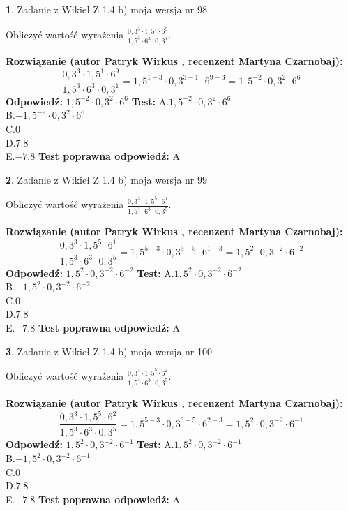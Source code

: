 \documentclass[12pt, a4paper]{article}
\theoremstyle{definition} %
\newtheorem{zad}{}
\newcommand{\zadStart}[1]{\begin{zad}#1\newline}
\newcommand{\zadStop}{\end{zad}}
\newcommand{\rozwStart}[2]{\noindent \textbf{Rozwiązanie (autor #1 , recenzent #2): }\newline}
\newcommand{\rozwStop}{\newline}
\newcommand{\odpStart}{\noindent \textbf{Odpowiedź:}\newline}
\newcommand{\odpStop}{\newline}
\newcommand{\testStart}{\noindent \textbf{Test:}\newline}
\newcommand{\testStop}{\newline}
\newcommand{\kluczStart}{\noindent \textbf{Test poprawna odpowiedź:}\newline}
\newcommand{\kluczStop}{\newline}
\begin{document}
\zadStart{Zadanie z Wikieł Z 1.4 b) moja wersja nr 98}

Obliczyć wartość wyrażenia $\frac{0,3^{3}\cdot1,5^{1}\cdot6^{9}}{1,5^{3}\cdot6^{3}\cdot0,3^{1}}$.
\zadStop
\rozwStart{Patryk Wirkus}{Martyna Czarnobaj}
$$\frac{0,3^{3}\cdot1,5^{1}\cdot6^{9}}{1,5^{3}\cdot6^{3}\cdot0,3^{1}} = 1,5^{1-3} \cdot 0,3^{3-1} \cdot 6^{9-3} = 1,5^{-2} \cdot 0,3^{2} \cdot 6^{6}$$
\rozwStop
\odpStart
$1,5^{-2} \cdot 0,3^{2} \cdot 6^{6}$
\odpStop
\testStart
A.$1,5^{-2} \cdot 0,3^{2} \cdot 6^{6}$\\ B.$-1,5^{-2} \cdot 0,3^{2} \cdot 6^{6}$\\ C.$0$\\ D.$7.8$\\ E.$-7.8$
\testStop
\kluczStart
A
\kluczStop



\zadStart{Zadanie z Wikieł Z 1.4 b) moja wersja nr 99}

Obliczyć wartość wyrażenia $\frac{0,3^{3}\cdot1,5^{5}\cdot6^{1}}{1,5^{3}\cdot6^{3}\cdot0,3^{5}}$.
\zadStop
\rozwStart{Patryk Wirkus}{Martyna Czarnobaj}
$$\frac{0,3^{3}\cdot1,5^{5}\cdot6^{1}}{1,5^{3}\cdot6^{3}\cdot0,3^{5}} = 1,5^{5-3} \cdot 0,3^{3-5} \cdot 6^{1-3} = 1,5^{2} \cdot 0,3^{-2} \cdot 6^{-2}$$
\rozwStop
\odpStart
$1,5^{2} \cdot 0,3^{-2} \cdot 6^{-2}$
\odpStop
\testStart
A.$1,5^{2} \cdot 0,3^{-2} \cdot 6^{-2}$\\ B.$-1,5^{2} \cdot 0,3^{-2} \cdot 6^{-2}$\\ C.$0$\\ D.$7.8$\\ E.$-7.8$
\testStop
\kluczStart
A
\kluczStop



\zadStart{Zadanie z Wikieł Z 1.4 b) moja wersja nr 100}

Obliczyć wartość wyrażenia $\frac{0,3^{3}\cdot1,5^{5}\cdot6^{2}}{1,5^{3}\cdot6^{3}\cdot0,3^{5}}$.
\zadStop
\rozwStart{Patryk Wirkus}{Martyna Czarnobaj}
$$\frac{0,3^{3}\cdot1,5^{5}\cdot6^{2}}{1,5^{3}\cdot6^{3}\cdot0,3^{5}} = 1,5^{5-3} \cdot 0,3^{3-5} \cdot 6^{2-3} = 1,5^{2} \cdot 0,3^{-2} \cdot 6^{-1}$$
\rozwStop
\odpStart
$1,5^{2} \cdot 0,3^{-2} \cdot 6^{-1}$
\odpStop
\testStart
A.$1,5^{2} \cdot 0,3^{-2} \cdot 6^{-1}$\\ B.$-1,5^{2} \cdot 0,3^{-2} \cdot 6^{-1}$\\ C.$0$\\ D.$7.8$\\ E.$-7.8$
\testStop
\kluczStart
A
\kluczStop
\end{document}
